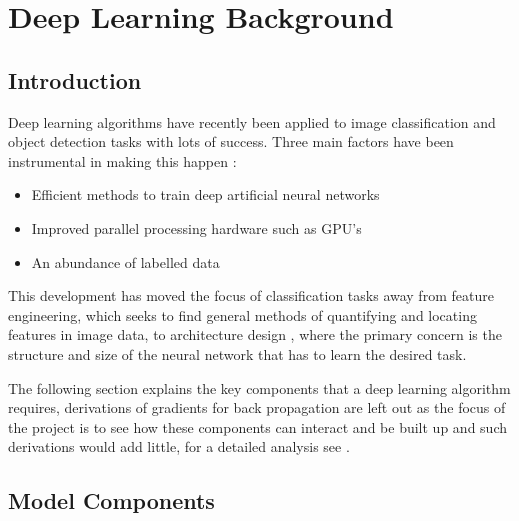 \chapter{Deep Learning Background} \label{chapter:deep}
  \section{Introduction}
    Deep learning algorithms have recently been applied to image classification
    and object detection tasks with lots of success. \cite{Girshick2014,Krizhevsky2012}
    Three main factors have been instrumental in making this happen \cite{Jaiswal2016}:
    \begin{itemize}
      \item Efficient methods to train deep artificial neural networks
      \item Improved parallel processing hardware such as GPU's
      \item An abundance of labelled data
    \end{itemize}
    This development has moved the focus of classification tasks away from feature engineering,
    which seeks to find general methods of quantifying and locating features in image data, to
    architecture design \cite{StephenMerity2016}, where the primary concern is the structure and size of the neural network that has to
    learn the desired task.

    The following section explains the key components that a deep learning algorithm requires,
    derivations of gradients for back propagation are left out as the focus of the project is to
    see how these components can interact and be built up and such derivations would add little,
    for a detailed analysis see \cite{Bishop1995}.
  \section{Model Components}
